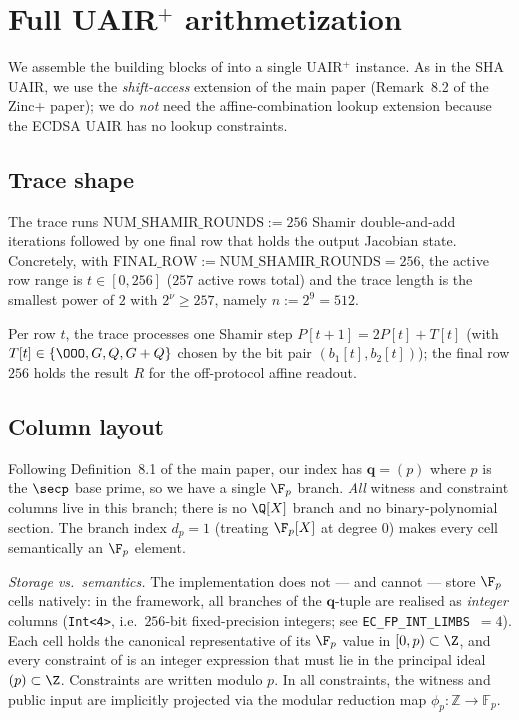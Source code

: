 \section{Full UAIR$^+$ arithmetization}\label{sec:uair}

We assemble the building blocks of  into a single
UAIR$^+$ instance. As in the SHA UAIR, we use the \emph{shift-access}
extension of the main paper (Remark~8.2 of the Zinc+ paper); we do
\emph{not} need the affine-combination lookup extension because the
ECDSA UAIR has no lookup constraints.

\subsection{Trace shape}\label{sec:trace-shape}

The trace runs $\mathrm{NUM\_SHAMIR\_ROUNDS} := 256$ Shamir
double-and-add iterations followed by one final row that holds the
output Jacobian state. Concretely, with
$\mathrm{FINAL\_ROW} := \mathrm{NUM\_SHAMIR\_ROUNDS} = 256$, the
active row range is $t \in [0, 256]$ ($257$ active rows total) and the
trace length is the smallest power of $2$ with
$2^{\nu} \ge 257$, namely $n := 2^{9} = 512$.

Per row $t$, the trace processes one Shamir step
$P[t+1] = 2P[t] + T[t]$ (with $T[t] \in \{\OOO, G, Q, G+Q\}$ chosen by
the bit pair $(b_1[t], b_2[t])$); the final row $256$ holds the
result $R$ for the off-protocol affine readout.

\subsection{Column layout}\label{sec:cols}

Following Definition~8.1 of the main paper, our index has
$\mathbf{q} = (p)$ where $p$ is the $\secp$ base prime, so we have a
single $\F_p$ branch. \emph{All} witness and constraint columns live
in this branch; there is no $\Q[X]$ branch and no binary-polynomial
section. The branch index $d_p = 1$ (treating $\F_p[X]$ at degree $0$)
makes every cell semantically an $\F_p$ element.

\emph{Storage vs.\ semantics.} The implementation does not — and
cannot — store $\F_p$ cells natively: in the framework, all branches
of the $\mathbf{q}$-tuple are realised as \emph{integer} columns
(\texttt{Int<4>}, i.e.\ $256$-bit fixed-precision integers; see
\texttt{EC\_FP\_INT\_LIMBS}~$=4$). Each cell holds the canonical
representative of its $\F_p$ value in $[0, p) \subset \Z$, and every
constraint of  is an integer expression that
must lie in the principal ideal $(p) \subset \Z$. Constraints are written modulo $p$. In all constraints, the witness and public input are implicitly projected via the modular reduction map $\phi_p: \mathbb{Z}\to \mathbb{F}_p$.



